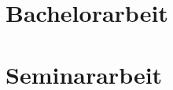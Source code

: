\documentclass[11pt,a4paper,sans]{moderncv}
\begin{document}
%
%

\nocite{*}



\clearpage
\section{Bachelorarbeit}
\section{Seminararbeit}
\end{document}
